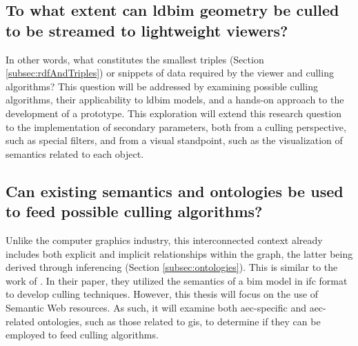 \subsection[Can \acs{ldbim} be culled?]{To what extent can \acs{ldbim} geometry be culled \\
	to be streamed to lightweight viewers?} \label{subsec:rq1}
In other words, what constitutes the smallest triples (Section \ref{subsec:rdfAndTriples}) or snippets of data required by the viewer and culling algorithms? This question will be addressed by examining possible culling algorithms, their applicability to \ac{ldbim} models, and a hands-on approach to the development of a prototype. This exploration will extend this research question to the implementation of secondary parameters, both from a culling perspective, such as special filters, and from a visual standpoint, such as the visualization of semantics related to each object.

\subsection[Can existing semantics be used?]{Can existing semantics and ontologies be used\\
	to feed possible culling algorithms?}\label{subsec:rq2}
Unlike the computer graphics industry, this interconnected context already includes both explicit and implicit relationships within the graph, the latter being derived through inferencing (Section \ref{subsec:ontologies}). This is similar to the work of \cite{Johansson2009}. In their paper, they utilized the semantics of a \ac{bim} model in \ac{ifc} format to develop culling techniques. However, this thesis will focus on the use of Semantic Web resources. As such, it will examine both \ac{aec}-specific and \ac{aec}-related ontologies, such as those related to \ac{gis}, to determine if they can be employed to feed culling algorithms.

